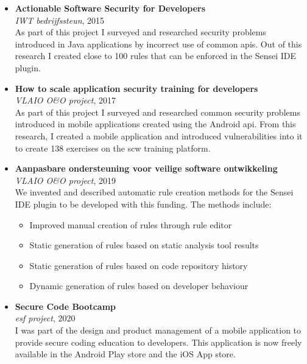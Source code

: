\begin{itemize}
    \item
    \textbf{Actionable Software Security for Developers}\\
    \emph{IWT bedrijfssteun}, 2015\\
    As part of this project I surveyed and researched security problems introduced in Java applications by incorrect use of common \glspl{api}.
    Out of this research I created close to 100 rules that can be enforced in the Sensei IDE plugin. 
    
    \item 
    \textbf{How to scale application security training for developers}\\
    \emph{VLAIO O\&O project}, 2017\\
    As part of this project I surveyed and researched common security problems introduced in mobile applications created using the Android \gls{api}.
    From this research, I created a mobile application and introduced vulnerabilities into it to create 138 exercises on the \gls{scw} training platform.
    
    \item
    \textbf{Aanpasbare ondersteuning voor veilige software ontwikkeling}\\
    \emph{VLAIO O\&O project}, 2019\\
    We invented and described automatic rule creation methods for the Sensei IDE plugin to be developed with this funding. The methods include:
    \begin{itemize}
        \item Improved manual creation of rules through rule editor
        \item Static generation of rules based on static analysis tool results
        \item Static generation of rules based on code repository history
        \item Dynamic generation of rules based on developer behaviour
    \end{itemize}
    
    \item 
    \textbf{Secure Code Bootcamp}\\
    \emph{\gls{esf} project}, 2020\\
    I was part of the design and product management of a mobile application to provide secure coding education to developers.
    This application is now freely available in the Android Play store and the iOS App store.
    
\end{itemize}

